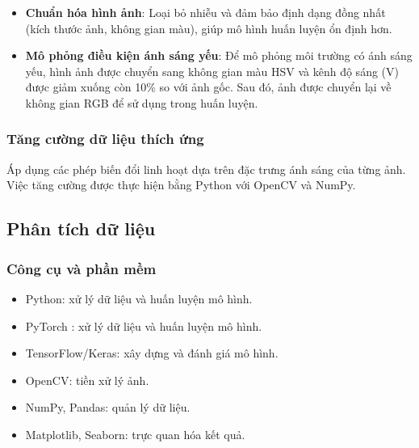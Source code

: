 \begin{itemize}
    \item \textbf{Chuẩn hóa hình ảnh}: Loại bỏ nhiễu và đảm bảo định dạng đồng nhất (kích thước ảnh, không gian màu), giúp mô hình huấn luyện ổn định hơn.
    
    \item \textbf{Mô phỏng điều kiện ánh sáng yếu}: Để mô phỏng môi trường có ánh sáng yếu, hình ảnh được chuyển sang không gian màu HSV và kênh độ sáng (V) được giảm xuống còn 10\% so với ảnh gốc. Sau đó, ảnh được chuyển lại về không gian RGB để sử dụng trong huấn luyện.
\end{itemize}

\subsubsection{Tăng cường dữ liệu thích ứng}
Áp dụng các phép biến đổi linh hoạt dựa trên đặc trưng ánh sáng của từng ảnh. Việc tăng cường được thực hiện bằng Python với OpenCV và NumPy.

\subsection{Phân tích dữ liệu}
\subsubsection{Công cụ và phần mềm}
\begin{itemize}
    \item Python: xử lý dữ liệu và huấn luyện mô hình.
    \item PyTorch : xử lý dữ liệu và huấn luyện mô hình.
    \item TensorFlow/Keras: xây dựng và đánh giá mô hình.
    \item OpenCV: tiền xử lý ảnh.
    \item NumPy, Pandas: quản lý dữ liệu.
    \item Matplotlib, Seaborn: trực quan hóa kết quả.
\end{itemize}

